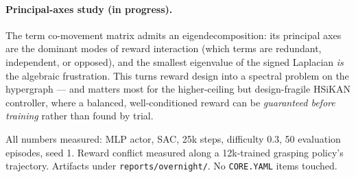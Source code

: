 \documentclass[11pt]{article}
\begin{document}
\paragraph{Principal-axes study (in progress).} The term co-movement matrix admits an eigendecomposition: its
principal axes are the dominant modes of reward interaction (which terms are redundant, independent, or opposed),
and the smallest eigenvalue of the signed Laplacian \emph{is} the algebraic frustration. This turns reward design
into a spectral problem on the hypergraph --- and matters most for the higher-ceiling but design-fragile HSiKAN
controller, where a balanced, well-conditioned reward can be \emph{guaranteed before training} rather than found
by trial.

\vspace{1em}
\noindent\footnotesize{All numbers measured: MLP actor, SAC, 25k steps, difficulty $0.3$, 50 evaluation episodes,
seed 1. Reward conflict measured along a 12k-trained grasping policy's trajectory. Artifacts under
\texttt{reports/overnight/}. No \texttt{CORE.YAML} items touched.}
\end{document}
